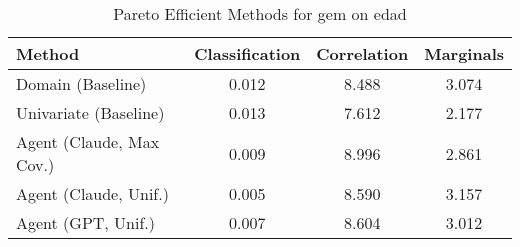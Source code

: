 \begin{table}[t!]
    \centering
    \caption{Pareto Efficient Methods for gem on edad}
    \label{tab:pareto_efficient_methods_gem_edad}
    \begin{tabular}{lccc}
    \toprule
    Method & Classification & Correlation & Marginals \\
    \midrule
    Domain (Baseline) & 0.012 & \cellcolor{silver!30}8.488 & 3.074 \\
    Univariate (Baseline) & 0.013 & \cellcolor{gold!30}7.612 & \cellcolor{gold!30}2.177 \\
    Agent (Claude, Max Cov.) & \cellcolor{bronze!30}0.009 & 8.996 & \cellcolor{silver!30}2.861 \\
    Agent (Claude, Unif.) & \cellcolor{gold!30}0.005 & \cellcolor{bronze!30}8.590 & 3.157 \\
    Agent (GPT, Unif.) & \cellcolor{silver!30}0.007 & 8.604 & \cellcolor{bronze!30}3.012 \\
    \bottomrule
    \end{tabular}
\end{table}